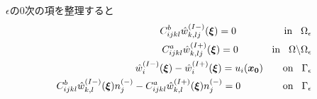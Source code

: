 $\epsilon$の0次の項を整理すると
\begin{align}
	C_{ijkl}^{b} \hat{w}^{(I-)}_{k,lj}(\bm{\xi})=0
	\hspace{1.7cm}\text{in}\hspace{0.3cm}\Omega_{\epsilon}
	\label{eq:GovDisturIn1}
	\\
	C_{ijkl}^{a} \hat{w}^{(I+)}_{k,lj}(\bm{\xi})=0
	\hspace{1.2cm}\text{in}\hspace{0.3cm}\Omega\backslash\Omega_{\epsilon}
	\label{eq:GovDisturOut1}
	\\
	\hat{w}_{i}^{(I-)}(\bm{\xi})-\hat{w}_{i}^{(I+)}(\bm{\xi})=u_{i}(\bm{x_0})
	\hspace{0.7cm}\text{on}\hspace{0.3cm}\Gamma_{\epsilon}
	\label{eq:GovDisturUBC1}
	\\
	C_{ijkl}^{b}\hat{w}_{k,l}^{(I-)}(\bm{\xi})n_{j}^{(-)}
	-C_{ijkl}^{a}\hat{w}_{k,l}^{(I+)}(\bm{\xi})n_{j}^{(-)}=0
	\hspace{1.5cm}\text{on}\hspace{0.3cm}\Gamma_{\epsilon}
	\label{eq:GovDisturSBC1}
\end{align}

